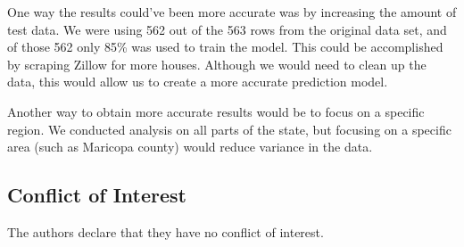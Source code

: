 \documentclass[12pt]{article}
\begin{document}
One way the results could've been more accurate was by increasing the amount of test data.
We were using 562 out of the 563 rows from the original data set, and of those 562 only 85\% was used to train the model.
This could be accomplished by scraping Zillow for more houses.
Although we would need to clean up the data, this would allow us to create a more accurate prediction model.

Another way to obtain more accurate results would be to focus on a specific region.
We conducted analysis on all parts of the state, but focusing on a specific area (such as Maricopa county) would reduce variance in the data.
\subsection*{Conflict of Interest}
The authors declare that they have no conflict of interest.

\printbibliography
\end{document}
